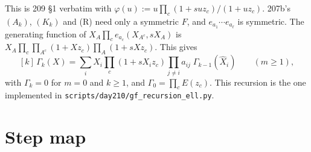 \documentclass[11pt]{amsart}
\theoremstyle{remark}
\newcommand{\hX}{\widehat{X}}
\begin{document}
This is 209 \S1 verbatim with $\varphi(u):=u\prod_c(1+suz_c)/(1+uz_c)$. 207b's $(A_k)$, $(K_k)$ and (R) need only a symmetric $F$, and $e_{a_1}\cdots e_{a_\ell}$ is symmetric. The generating function of $X_A\prod_ce_{a_c}(X_{A^c},sX_A)$ is $X_A\prod_c\prod_{A^c}(1+Xz_c)\prod_A(1+sXz_c)$. This gives
\begin{equation}\tag{R$\ell$}
[k]\,\Gamma_k(X)=\sum_iX_i\prod_c(1+sX_iz_c)\prod_{j\ne i}a_{ij}\;\Gamma_{k-1}(\hX_i)\qquad(m\ge1),
\end{equation}
with $\Gamma_k=0$ for $m=0$ and $k\ge1$, and $\Gamma_0=\prod_cE(z_c)$. This recursion is the one implemented in \texttt{scripts/day210/gf\_recursion\_ell.py}.

\section{Step map}\label{sec:step}
\end{document}
